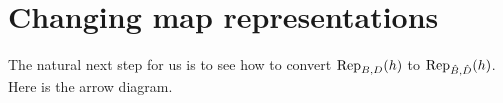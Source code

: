 \documentclass[10pt,t]{beamer}
\begin{document}
\begin{frame}
\co[co:MatrixNonsingularIffChangesBasis]
\end{frame}




\section{Changing map representations}
\begin{frame}
The natural next step for us is to see how to convert $\rep{h}{B,D}$
to $\rep{h}{\hat{B},\hat{D}}$.
Here is the arrow diagram.
\end{frame}
\end{document}

